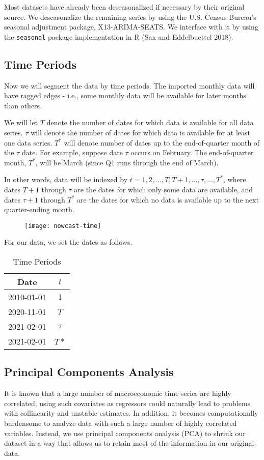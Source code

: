 \documentclass[11pt, letterpaper]{article}\usepackage[]{graphicx}\usepackage[]{color}
\begin{document}
Most datasets have already been deseasonalized if necessary by their original source. We deseasonalize the remaining series by using the U.S. Census Bureau's seasonal adjustment package, X13-ARIMA-SEATS. We interface with it by using the \texttt{seasonal} package implementation in R (Sax and Eddelbuettel 2018).

\subsection{Time Periods}
Now we will segment the data by time periods. The imported monthly data will have ragged edges - i.e., some monthly data will be available for later months than others.

We will let $T$ denote the number of dates for which data is available for all data series. $\tau$ will denote the number of dates for which data is available for at least one data series. $T^*$ will denote number of dates up to the end-of-quarter month of the $\tau$ date. For example, suppose date $\tau$ occurs on February. The end-of-quarter month, $T^*$, will be March (since Q1 runs through the end of March). 

In other words, data will be indexed by $t = 1, 2, \dots, T, T+1, \dots, \tau, \dots, T^*$, where dates $T + 1$ through $\tau$ are the dates for which only some data are available, and dates $\tau + 1$ through $T^*$ are the dates for which no data is available up to the next quarter-ending month.
\begin{figure}[H]
\texttt{[image: nowcast-time]}
\centering
\end{figure}
For our data, we set the dates as follows.
\begin{table}[H]
\centering
\begingroup\footnotesize
\begin{tabular}{cc}
  \hline
Date & $t$ \\ 
  \hline
2010-01-01 & $1$ \\ 
  2020-11-01 & $T$ \\ 
  2021-02-01 & $\tau$ \\ 
  2021-02-01 & $T*$ \\ 
   \hline
\end{tabular}
\endgroup
\caption{Time Periods} 
\end{table}


\subsection{Principal Components Analysis}
It is known that a large number of macroeconomic time series are highly correlated; using such covariates as regressors could naturally lead to problems with collinearity and unstable estimates. In addition, it becomes computationally burdensome to analyze data with such a large number of highly correlated variables. Instead, we use principal components analysis (PCA) to shrink our dataset in a way that allows us to retain most of the information in our original data.
\end{document}
